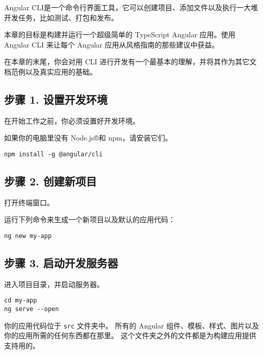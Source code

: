 \documentclass{progartcn}
\begin{document}
Angular CLI是一个命令行界面工具，它可以创建项目、添加文件以及执行一大堆开发任务，比如测试、打包和发布。

本章的目标是构建并运行一个超级简单的 TypeScript Angular 应用。使用 Angular CLI 来让每个 Angular 应用从风格指南的那些建议中获益。

在本章的末尾，你会对用 CLI 进行开发有一个最基本的理解，并将其作为其它文档范例以及真实应用的基础。

\subsection{步骤 1. 设置开发环境}

在开始工作之前，你必须设置好开发环境。

如果你的电脑里没有 Node.js®和 npm，请安装它们。

\begin{invertedshellbox}
\begin{verbatim}
npm install -g @angular/cli
\end{verbatim}
\end{invertedshellbox}

\subsection{步骤 2. 创建新项目}

打开终端窗口。

运行下列命令来生成一个新项目以及默认的应用代码：

\begin{invertedshellbox}
\begin{verbatim}
ng new my-app
\end{verbatim}
\end{invertedshellbox}

\subsection{步骤 3. 启动开发服务器}

进入项目目录，并启动服务器。

\begin{invertedshellbox}
\begin{verbatim}
cd my-app
ng serve --open
\end{verbatim}
\end{invertedshellbox}

你的应用代码位于 \verb|src| 文件夹中。 所有的 Angular 组件、模板、样式、图片以及你的应用所需的任何东西都在那里。 这个文件夹之外的文件都是为构建应用提供支持用的。
\end{document}
